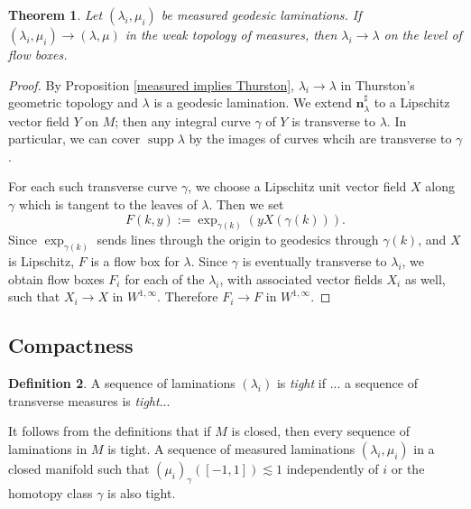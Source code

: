 \documentclass[reqno,10pt]{amsart}
\DeclareMathOperator{\supp}{supp}
\newcommand{\normal}{\mathbf n}
\newcommand{\dfn}[1]{\emph{#1}\index{#1}}
\newtheorem{theorem}{Theorem}[section]
\theoremstyle{definition}
\newtheorem{definition}[theorem]{Definition}
\numberwithin{equation}{section}
\begin{document}
\begin{theorem}
Let $(\lambda_i, \mu_i)$ be measured geodesic laminations.
If $(\lambda_i, \mu_i) \to (\lambda, \mu)$ in the weak topology of measures, then $\lambda_i \to \lambda$ on the level of flow boxes.
\end{theorem}
\begin{proof}
By Proposition \ref{measured implies Thurston}, $\lambda_i \to \lambda$ in Thurston's geometric topology and $\lambda$ is a geodesic lamination.
We extend $\normal_\lambda^\sharp$ to a Lipschitz vector field $Y$ on $M$; then any integral curve $\gamma$ of $Y$ is transverse to $\lambda$.
In particular, we can cover $\supp \lambda$ by the images of curves whcih are transverse to $\gamma$.

For each such transverse curve $\gamma$, we choose a Lipschitz unit vector field $X$ along $\gamma$ which is tangent to the leaves of $\lambda$.
Then we set
$$F(k, y) := \exp_{\gamma(k)}(yX(\gamma(k))).$$
Since $\exp_{\gamma(k)}$ sends lines through the origin to geodesics through $\gamma(k)$, and $X$ is Lipschitz, $F$ is a flow box for $\lambda$.
Since $\gamma$ is eventually transverse to $\lambda_i$, we obtain flow boxes $F_i$ for each of the $\lambda_i$, with associated vector fields $X_i$ as well, such that $X_i \to X$ in $W^{1, \infty}$. Therefore $F_i \to F$ in $W^{1, \infty}$.
\end{proof}

\subsection{Compactness}
\begin{definition}
A sequence of laminations $(\lambda_i)$ is \dfn{tight} if ... a sequence of transverse measures is \dfn{tight}...
\end{definition}

It follows from the definitions that if $M$ is closed, then every sequence of laminations in $M$ is tight.
A sequence of measured laminations $(\lambda_i, \mu_i)$ in a closed manifold such that $(\mu_i)_\gamma([-1, 1]) \lesssim 1$ independently of $i$ or the homotopy class $\gamma$ is also tight.
\end{document}
